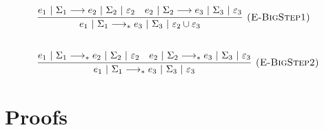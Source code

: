 \documentclass{llncs}
\begin{document}
			

\[
\begin{array}{lll}
			
			\infer[\textsc{(E-BigStep1)}]
			{e_1~|~\Sigma_1 \longrightarrow_* e_3~|~\Sigma_3~|~\varepsilon_2 \cup \varepsilon_3}
			{e_1~|~\Sigma_1 \longrightarrow e_2~|~\Sigma_2~|~\varepsilon_2
		  & e_2~|~\Sigma_2 \longrightarrow e_3~|~\Sigma_3~|~\varepsilon_3} \\[5ex]
			
			\infer[\textsc{(E-BigStep2)}]
			{e_1~|~\Sigma_1 \longrightarrow_* e_3~|~\Sigma_3~|~\varepsilon_3}
			{e_1~|~\Sigma_1 \longrightarrow_* e_2~|~\Sigma_2~|~\varepsilon_2 & e_2~|~\Sigma_2 \longrightarrow_* e_3~|~\Sigma_3~|~\varepsilon_3 }
			
		
\end{array}
\]

\newpage

\section{Proofs}
\end{document}

